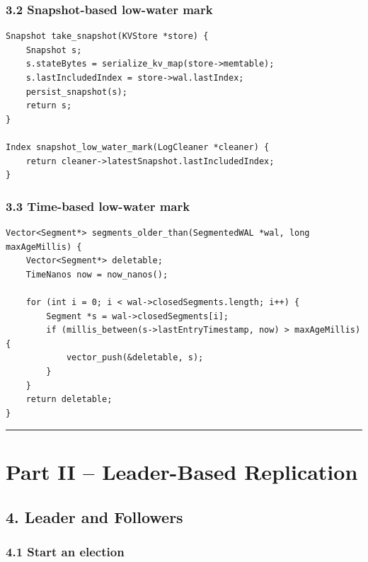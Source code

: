 \documentclass[10pt,letterpaper]{article}
\begin{document}
\subsubsection*{3.2 Snapshot-based low-water mark}

\begin{verbatim}
Snapshot take_snapshot(KVStore *store) {
    Snapshot s;
    s.stateBytes = serialize_kv_map(store->memtable);
    s.lastIncludedIndex = store->wal.lastIndex;
    persist_snapshot(s);
    return s;
}

Index snapshot_low_water_mark(LogCleaner *cleaner) {
    return cleaner->latestSnapshot.lastIncludedIndex;
}
\end{verbatim}

\subsubsection*{3.3 Time-based low-water mark}

\begin{verbatim}
Vector<Segment*> segments_older_than(SegmentedWAL *wal, long maxAgeMillis) {
    Vector<Segment*> deletable;
    TimeNanos now = now_nanos();

    for (int i = 0; i < wal->closedSegments.length; i++) {
        Segment *s = wal->closedSegments[i];
        if (millis_between(s->lastEntryTimestamp, now) > maxAgeMillis) {
            vector_push(&deletable, s);
        }
    }
    return deletable;
}
\end{verbatim}

\medskip\hrule\medskip

\clearpage
\section*{Part II -- Leader-Based Replication}

\subsection*{4. Leader and Followers}

\subsubsection*{4.1 Start an election}
\end{document}
